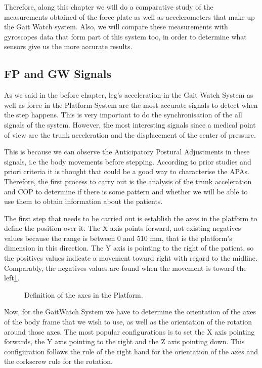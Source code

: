 Therefore, along this chapter we will do a comparative study of the measurements obtained of the force plate as well as accelerometers that make up the Gait Watch system. Also, we will compare these measurements with gyroscopes data that form part of this system too, in order to determine what sensors give us the more accurate results.

\subsection{FP and GW Signals}
As we said in the before chapter, leg's acceleration in the Gait Watch System as well as force in the Platform System are the most accurate signals to detect when the step happens. This is very important to do the synchronisation of the all signals of the system. However, the most interesting signals since a medical point of view are the trunk acceleration and the displacement of the center of pressure.

This is because we can observe the Anticipatory Postural Adjustments in these signals, i.e the body movements before stepping. According to prior studies and priori criteria it is thought that could be a good way to characterise the APAs.
Therefore, the first process to carry out is the analysis of the trunk acceleration and COP to determine if there is some pattern and whether we will be able to use them to obtain information about the patients.

The first step that needs to be carried out is establish the axes in the platform to define the position over it. The X axis points forward, not existing negatives values because the range is between 0 and 510 mm, that is the platform’s dimension in this direction. The Y axis is pointing to the right of the patient, so the positives values indicate a movement toward right with regard to the midline. Comparably, the negatives values are found when the movement is toward the left\ref{fig:axesFP}.

\begin{figure}[H]
	\centering
	\caption{Definition of the axes in the Platform.}
	\label{fig:axesFP}
\end{figure}

Now, for the GaitWatch System we have to determine the orientation of the axes of the body frame that we wish to use, as well as the orientation of the rotation around those axes. The most popular configurations is to set the X axis pointing forwards, the Y axis pointing to the right and the Z axis pointing down. This configuration follows the rule of the right hand for the orientation of the axes and the corkscrew rule for the rotation. \cite{OlivaresBotzel2013}

